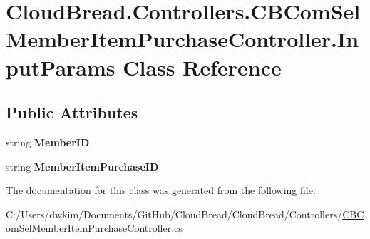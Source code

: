 \hypertarget{a00123}{}\section{Cloud\+Bread.\+Controllers.\+C\+B\+Com\+Sel\+Member\+Item\+Purchase\+Controller.\+Input\+Params Class Reference}
\label{a00123}
\subsection*{Public Attributes}
\begin{DoxyCompactItemize}
\item 
string {\bfseries Member\+ID}\hypertarget{a00123_a8297a022246657bb8b9f6e18cc64c3a7}{}\label{a00123_a8297a022246657bb8b9f6e18cc64c3a7}

\item 
string {\bfseries Member\+Item\+Purchase\+ID}\hypertarget{a00123_a72719255f3371469fb5fccc3c2a145d6}{}\label{a00123_a72719255f3371469fb5fccc3c2a145d6}

\end{DoxyCompactItemize}


The documentation for this class was generated from the following file\+:\begin{DoxyCompactItemize}
\item 
C\+:/\+Users/dwkim/\+Documents/\+Git\+Hub/\+Cloud\+Bread/\+Cloud\+Bread/\+Controllers/\hyperlink{a00206}{C\+B\+Com\+Sel\+Member\+Item\+Purchase\+Controller.\+cs}\end{DoxyCompactItemize}
